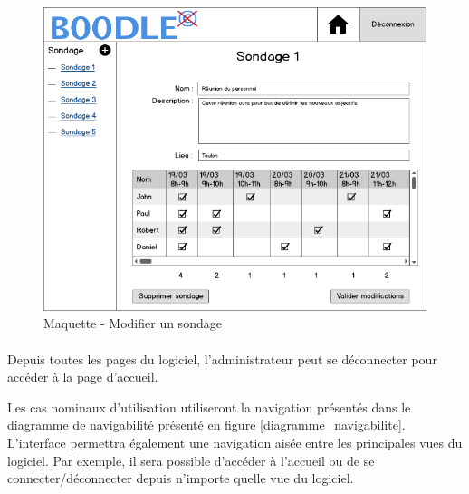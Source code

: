 \documentclass[titlepage]{report}
\begin{document}
\begin{figure}[h]
	\caption{Maquette - Modifier un sondage}
	\label{maquette_modifierEvenement}
	\centering
	\includegraphics[scale=0.7]{figures/maquettes/modifierEvenement.png}
\end{figure}

\paragraph{}Depuis toutes les pages du logiciel, l'administrateur peut se déconnecter pour accéder à la page d'accueil.
\par Les cas nominaux d'utilisation utiliseront la navigation présentés dans le diagramme de navigabilité présenté en figure \ref{diagramme_navigabilite}. L'interface permettra également une navigation aisée entre les principales vues du logiciel. 
Par exemple, il sera possible d'accéder à l'accueil ou de se connecter/déconnecter depuis n'importe quelle vue du logiciel.
\end{document}
